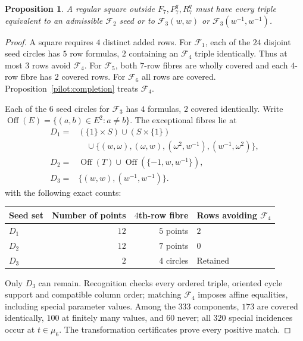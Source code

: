 \documentclass[11pt,a4paper]{article}
\newtheorem{proposition}[theorem]{Proposition}
\theoremstyle{plain}
\theoremstyle{definition}
\numberwithin{equation}{section}
\begin{document}
\begin{proposition}\label{census:reduction}\label{census:consequences}
A regular square outside $F_7,P_7^q,R_7^q$ must have every triple equivalent to an admissible $\mathcal F_2$ seed or to $\mathcal F_3(w,w)$ or $\mathcal F_3(w^{-1},w^{-1})$.
\end{proposition}
\begin{proof}
A square requires $4$ distinct added rows. For $\mathcal F_1$, each of the $24$ disjoint seed circles has $5$ row formulas, $2$ containing an $\mathcal F_4$ triple identically. Thus at most $3$ rows avoid $\mathcal F_4$. For $\mathcal F_5$, both $7$-row fibres are wholly covered and each $4$-row fibre has $2$ covered rows. For $\mathcal F_6$ all rows are covered. Proposition~\ref{pilot:completion} treats $\mathcal F_4$.

Each of the $6$ seed circles for $\mathcal F_3$ has $4$ formulas, $2$ covered identically. Write $\operatorname{Off}(E)=\{(a,b)\in E^2:a\ne b\}$. The exceptional fibres lie at
$$
\begin{aligned}
D_1={}&(\{1\}\times S)\cup(S\times\{1\})\\
 &\quad\cup\{(w,\omega),(\omega,w),(\omega^2,w^{-1}),(w^{-1},\omega^2)\},\\
D_2={}&\operatorname{Off}(T)\cup\operatorname{Off}(\{-1,w,w^{-1}\}),\\
D_3={}&\{(w,w),(w^{-1},w^{-1})\}.
\end{aligned}
$$
with the following exact counts:
\begin{center}\begin{tabular}{@{}lrrl@{}}\toprule
Seed set & Number of points & $4$th-row fibre & Rows avoiding $\mathcal{F}_4$\\\midrule
$D_1$&$12$&$5$ points&$2$\\
$D_2$&$12$&$7$ points&$0$\\
$D_3$&$2$&$4$ circles&Retained\\\bottomrule
\end{tabular}\end{center}
Only $D_3$ can remain. Recognition checks every ordered triple, oriented cycle support and compatible column order; matching $\mathcal F_4$ imposes affine equalities, including special parameter values. Among the $333$ components, $173$ are covered identically, $100$ at finitely many values, and $60$ never; all $320$ special incidences occur at $t\in\mu_6$. The transformation certificates prove every positive match.
\end{proof}
\end{document}
